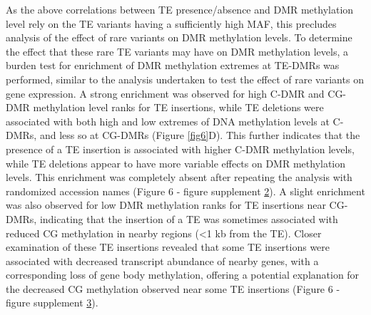 \documentclass[12pt]{article}
\begin{document}
As the above correlations between TE presence/absence and DMR
methylation level rely on the TE variants having a sufficiently high
MAF, this precludes analysis of the effect of rare variants on DMR
methylation levels. To determine the effect that these rare TE
variants may have on DMR methylation levels, a burden test for
enrichment of DMR methylation extremes at TE-DMRs was performed,
similar to the analysis undertaken to test the effect of rare variants
on gene expression. A strong enrichment was observed for high C-DMR
and CG-DMR methylation level ranks for TE insertions, while TE
deletions were associated with both high and low extremes of DNA
methylation levels at C-DMRs, and less so at CG-DMRs (Figure
\ref{fig6}D). This further indicates that the presence of a TE
insertion is associated with higher C-DMR methylation levels, while TE
deletions appear to have more variable effects on DMR methylation
levels. This enrichment was completely absent after repeating the
analysis with randomized accession names (Figure 6 - figure supplement
\hyperref[fig6s2]{2}). A slight enrichment was also observed for low
DMR methylation ranks for TE insertions near CG-DMRs, indicating that
the insertion of a TE was sometimes associated with reduced CG
methylation in nearby regions (\textless{}1 kb from the TE). Closer
examination of these TE insertions revealed that some TE insertions
were associated with decreased transcript abundance of nearby genes,
with a corresponding loss of gene body methylation, offering a
potential explanation for the decreased CG methylation observed near
some TE insertions (Figure 6 - figure supplement
\hyperref[fig6s3]{3}).
\end{document}
